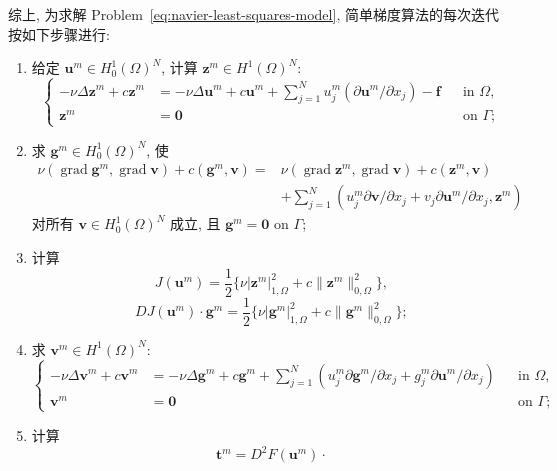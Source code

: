 综上, 为求解 Problem~\eqref{eq:navier-least-squares-model}, 简单梯度算法的每次迭代
按如下步骤进行:
\begin{enumerate}
\item[1$^\circ$)] 给定 $\boldsymbol u^m\in H_0^1(\Omega)^N$, 计算
$\boldsymbol z^m\in H^1(\Omega)^N$:
\[
\left\{
\begin{aligned}
-\nu\Delta\boldsymbol z^m+c\boldsymbol z^m
&=-\nu\Delta\boldsymbol u^m+c\boldsymbol u^m
+\sum_{j=1}^Nu_j^m(\partial\boldsymbol u^m/\partial x_j)-\boldsymbol f
&&\text{in }\Omega,\\
\boldsymbol z^m&=\boldsymbol0&&\text{on }\Gamma;
\end{aligned}
\right.
\]
\item[2$^\circ$)] 求 $\boldsymbol g^m\in H_0^1(\Omega)^N$, 使
\[
\begin{aligned}
\nu(\operatorname{grad}\boldsymbol g^m,\operatorname{grad}\boldsymbol v)
+c(\boldsymbol g^m,\boldsymbol v)
={}&\nu(\operatorname{grad}\boldsymbol z^m,\operatorname{grad}\boldsymbol v)
+c(\boldsymbol z^m,\boldsymbol v)\\
&+\sum_{j=1}^N
(u_j^m\partial\boldsymbol v/\partial x_j
+v_j\partial\boldsymbol u^m/\partial x_j,\boldsymbol z^m)
\end{aligned}
\]
对所有 $\boldsymbol v\in H_0^1(\Omega)^N$ 成立, 且
$\boldsymbol g^m=\boldsymbol0$ on $\Gamma$;
\item[3$^\circ$)] 计算
\begin{equation}
\label{eq:navier-least-squares-functional-value}
J(\boldsymbol u^m)=\frac12\{\nu|\boldsymbol z^m|_{1,\Omega}^2
+c\|\boldsymbol z^m\|_{0,\Omega}^2\},
\end{equation}
\begin{equation}
\label{eq:navier-least-squares-gradient-value}
DJ(\boldsymbol u^m)\mathbin{\cdot}\boldsymbol g^m
=\frac12\{\nu|\boldsymbol g^m|_{1,\Omega}^2
+c\|\boldsymbol g^m\|_{0,\Omega}^2\};
\end{equation}
\item[4$^\circ$)] 求 $\boldsymbol v^m\in H^1(\Omega)^N$:
\[
\left\{
\begin{aligned}
-\nu\Delta\boldsymbol v^m+c\boldsymbol v^m
&=-\nu\Delta\boldsymbol g^m+c\boldsymbol g^m
+\sum_{j=1}^N
(u_j^m\partial\boldsymbol g^m/\partial x_j
+g_j^m\partial\boldsymbol u^m/\partial x_j)
&&\text{in }\Omega,\\
\boldsymbol v^m&=\boldsymbol0&&\text{on }\Gamma;
\end{aligned}
\right.
\]
\item[5$^\circ$)] 计算
\[
\boldsymbol t^m=D^2F(\boldsymbol u^m)\mathbin{\cdot}
\]
\end{enumerate}
